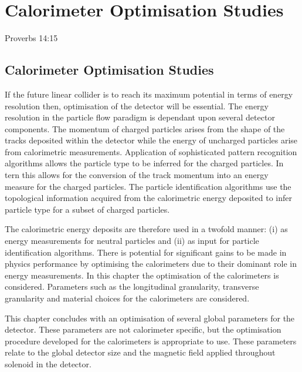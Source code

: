 \chapter{Calorimeter Optimisation Studies}
\label{chap:detopt}

{Proverbs 14:15}


\section{Calorimeter Optimisation Studies}
\label{sec:optimisationstudies}
If the future linear collider is to reach its maximum potential in terms of energy resolution then, optimisation of the detector will be essential.  The energy resolution in the particle flow paradigm is dependant upon several detector components.  The momentum of charged particles arises from the shape of the tracks deposited within the detector while the energy of uncharged particles arise from calorimetric measurements.  Application of sophisticated pattern recognition algorithms allows the particle type to be inferred for the charged particles.  In tern this allows for the conversion of the track momentum into an energy measure for the charged particles.  The particle identification algorithms use the topological information acquired from the calorimetric energy deposited to infer particle type for a subset of charged particles.  

The calorimetric energy deposits are therefore used in a twofold manner: (i) as energy measurements for neutral particles and (ii) as input for particle identification algorithms.  There is potential for significant gains to be made in physics performance by optimising the calorimeters due to their dominant role in energy measurements.  In this chapter the optimisation of the calorimeters is considered.  Parameters such as the longitudinal granularity, transverse granularity and material choices for the calorimeters are considered.  

This chapter concludes with an optimisation of several global parameters for the detector.  These parameters are not calorimeter specific, but the optimisation procedure developed for the calorimeters is appropriate to use.  These parameters relate to the global detector size and the magnetic field applied throughout solenoid in the detector.

